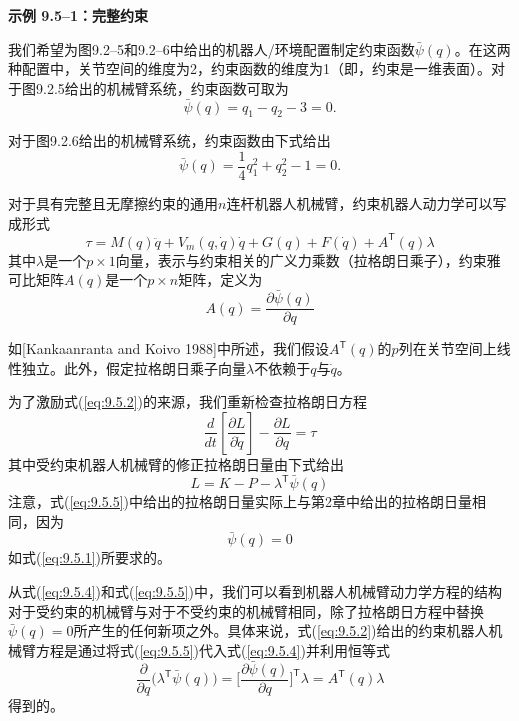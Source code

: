 \documentclass[12pt,a4paper]{ctexart}
\begin{document}
\textbf{示例 9.5--1：完整约束}

我们希望为图9.2--5和9.2--6中给出的机器人/环境配置制定约束函数$\bar{\psi}(q)$。在这两种配置中，关节空间的维度为2，约束函数的维度为1（即，约束是一维表面）。对于图9.2.5给出的机械臂系统，约束函数可取为
\begin{equation*}
\bar{\psi}(q) = q_1 - q_2 - 3 = 0.
\end{equation*}

对于图9.2.6给出的机械臂系统，约束函数由下式给出
\begin{equation*}
\bar{\psi}(q) = \frac{1}{4}q_1^2 + q_2^2 - 1 = 0.
\end{equation*}

对于具有完整且无摩擦约束的通用$n$连杆机器人机械臂，约束机器人动力学可以写成形式
\begin{equation}\label{eq:9.5.2}
\tau = M(q)\ddot{q} + V_m(q, \dot{q})\dot{q} + G(q) + F(\dot{q}) + A^{\mathsf T}(q)\lambda
\end{equation}
其中$\lambda$是一个$p \times 1$向量，表示与约束相关的广义力乘数（拉格朗日乘子），约束雅可比矩阵$A(q)$是一个$p \times n$矩阵，定义为
\begin{equation}\label{eq:9.5.3}
A(q) = \frac{\partial \bar{\psi}(q)}{\partial q}
\end{equation}

如[Kankaanranta and Koivo 1988]中所述，我们假设$A^{\mathsf T}(q)$的$p$列在关节空间上线性独立。此外，假定拉格朗日乘子向量$\lambda$不依赖于$q$与$\dot{q}$。

为了激励式(\ref{eq:9.5.2})的来源，我们重新检查拉格朗日方程
\begin{equation}\label{eq:9.5.4}
\frac{d}{dt}\left[\frac{\partial L}{\partial \dot{q}}\right] - \frac{\partial L}{\partial q} = \tau
\end{equation}
其中受约束机器人机械臂的修正拉格朗日量由下式给出
\begin{equation}\label{eq:9.5.5}
L = K - P - \lambda^{\mathsf T} \bar{\psi}(q)
\end{equation}
注意，式(\ref{eq:9.5.5})中给出的拉格朗日量实际上与第2章中给出的拉格朗日量相同，因为
\[
\bar{\psi}(q) = 0
\]
如式(\ref{eq:9.5.1})所要求的。

从式(\ref{eq:9.5.4})和式(\ref{eq:9.5.5})中，我们可以看到机器人机械臂动力学方程的结构对于受约束的机械臂与对于不受约束的机械臂相同，除了拉格朗日方程中替换$\bar{\psi}(q) = 0$所产生的任何新项之外。具体来说，式(\ref{eq:9.5.2})给出的约束机器人机械臂方程是通过将式(\ref{eq:9.5.5})代入式(\ref{eq:9.5.4})并利用恒等式
\[
\frac{\partial}{\partial q}\bigl(\lambda^{\mathsf T}\bar{\psi}(q)\bigr) = \biggl[\frac{\partial \bar{\psi}(q)}{\partial q}\biggr]^{\mathsf T}\lambda = A^{\mathsf T}(q)\lambda
\]
得到的。
\end{document}
